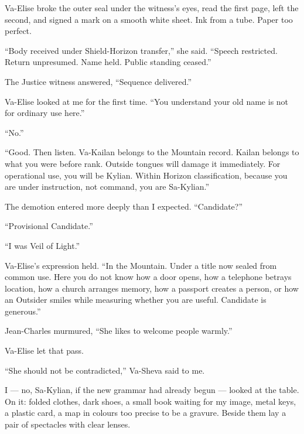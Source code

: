 Va-Elise broke the outer seal under the witness's eyes, read the first page, left the second, and signed a mark on a smooth white sheet. Ink from a tube. Paper too perfect.\par

``Body received under Shield-Horizon transfer,'' she said. ``Speech restricted. Return unpresumed. Name held. Public standing ceased.''\par

The Justice witness answered, ``Sequence delivered.''\par

Va-Elise looked at me for the first time. ``You understand your old name is not for ordinary use here.''\par

``No.''\par

``Good. Then listen. Va-Kailan belongs to the Mountain record. Kailan belongs to what you were before rank. Outside tongues will damage it immediately. For operational use, you will be Kylian. Within Horizon classification, because you are under instruction, not command, you are Sa-Kylian.''\par

The demotion entered more deeply than I expected. ``Candidate?''\par

``Provisional Candidate.''\par

``I was Veil of Light.''\par

Va-Elise's expression held. ``In the Mountain. Under a title now sealed from common use. Here you do not know how a door opens, how a telephone betrays location, how a church arranges memory, how a passport creates a person, or how an Outsider smiles while measuring whether you are useful. Candidate is generous.''\par

Jean-Charles murmured, ``She likes to welcome people warmly.''\par

Va-Elise let that pass.\par

``She should not be contradicted,'' Va-Sheva said to me.\par

I --- no, Sa-Kylian, if the new grammar had already begun --- looked at the table. On it: folded clothes, dark shoes, a small book waiting for my image, metal keys, a plastic card, a map in colours too precise to be a gravure. Beside them lay a pair of spectacles with clear lenses.\par

